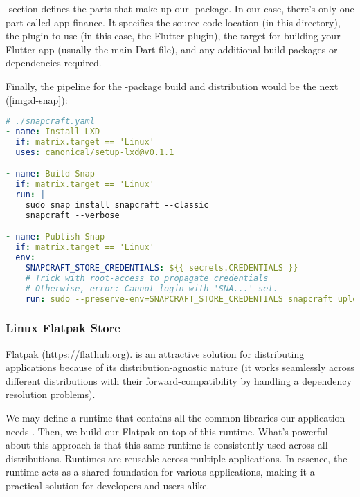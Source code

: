 \noindent {}-section defines the parts that make up our -package. In our case, there's only one part 
called app-finance. It specifies the source code location (in this directory), the plugin to use (in this case, the 
Flutter plugin), the target for building your Flutter app (usually the main Dart file), and any additional build 
packages or dependencies required.

Finally, the pipeline for the -package build and distribution would be the next  (\cref{img:d-snap}):

\begin{lstlisting}[language=yaml]
# ./snapcraft.yaml
- name: Install LXD
  if: matrix.target == 'Linux'
  uses: canonical/setup-lxd@v0.1.1

- name: Build Snap
  if: matrix.target == 'Linux'
  run: |
    sudo snap install snapcraft --classic
    snapcraft --verbose

- name: Publish Snap
  if: matrix.target == 'Linux'
  env:
    SNAPCRAFT_STORE_CREDENTIALS: ${{ secrets.CREDENTIALS }}
    # Trick with root-access to propagate credentials
    # Otherwise, error: Cannot login with 'SNA...' set.
    run: sudo --preserve-env=SNAPCRAFT_STORE_CREDENTIALS snapcraft upload *.snap --release=latest/stable
\end{lstlisting}



\subsubsection{Linux Flatpak Store}

Flatpak (\href{https://flathub.org}{https://flathub.org}). is an attractive solution for distributing applications 
because of its distribution-agnostic nature (it works seamlessly across different distributions with their 
forward-compatibility by handling a dependency resolution problems).

We may define a runtime that contains all the common libraries our application needs . Then, we build our 
Flatpak on top of this runtime. What's powerful about this approach is that this same runtime is consistently used 
across all distributions. Runtimes are reusable across multiple applications. In essence, the runtime acts as a 
shared foundation for various applications, making it a practical solution for developers and users alike. 


